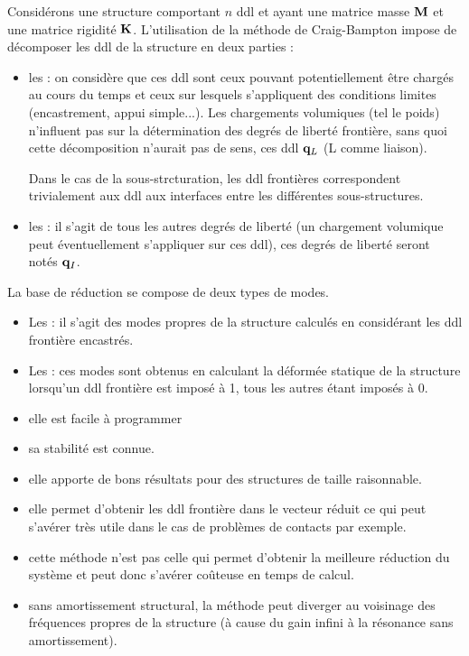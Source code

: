 Considérons une structure comportant $n$ ddl et ayant une matrice masse $\MM{M}$ et une matrice rigidité $\MM{K}$. 
L'utilisation de la méthode de Craig-Bampton 
impose de décomposer les ddl de la structure en deux parties :
\begin{itemize}
   \item les : on considère que ces ddl sont ceux pouvant potentiellement être chargés au cours du temps 
	et ceux sur lesquels s'appliquent des conditions limites (encastrement, appui simple...). Les chargements volumiques 
	(tel le poids) n'influent pas sur la détermination des degrés de liberté frontière, sans quoi cette décomposition n'aurait 
	pas de sens, ces ddl $\VV{q}_L$ (L comme liaison).

	Dans le cas de la sous-strcturation, les ddl frontières correspondent trivialement aux ddl aux interfaces entre
	les différentes sous-structures.
   \item les : il s'agit de tous les autres degrés de liberté (un chargement volumique peut éventuellement 
	s'appliquer sur ces ddl), ces degrés de liberté seront notés $\VV{q}_I$.
\end{itemize}
\medskipvm
La base de réduction se compose de deux types de modes.
\begin{itemize}
   \item Les : il s'agit des modes propres de la structure calculés en considérant les ddl frontière encastrés.
   \item Les : ces modes sont obtenus en calculant la déformée statique de la structure lorsqu'un ddl frontière 
	est imposé à 1, tous les autres étant imposés à 0.
\end{itemize}
\medskipvm
{}
\begin{itemize}
   \item elle est facile à programmer
   \item sa stabilité est connue. 
   \item elle apporte de bons résultats pour des structures de taille raisonnable. 
   \item elle permet d'obtenir les ddl frontière dans le vecteur réduit ce qui peut s'avérer très utile dans le cas de problèmes de contacts 
	par exemple.
\end{itemize}
\medskipvm
{}
\begin{itemize}
   \item cette méthode n'est pas celle qui permet d'obtenir la meilleure réduction du système et peut donc s'avérer coûteuse en temps de calcul. 
   \item sans amortissement structural, la méthode peut diverger au voisinage des fréquences propres de la structure (à cause du gain infini à 
	la résonance sans amortissement).
\end{itemize}


